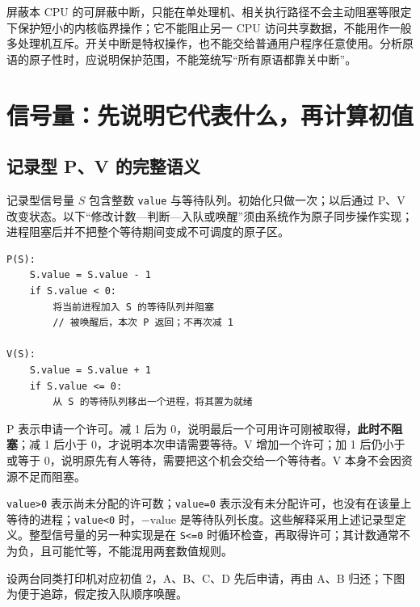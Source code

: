 屏蔽本 CPU 的可屏蔽中断，只能在单处理机、相关执行路径不会主动阻塞等限定下保护短小的内核临界操作；它不能阻止另一 CPU 访问共享数据，不能用作一般多处理机互斥。开关中断是特权操作，也不能交给普通用户程序任意使用。分析原语的原子性时，应说明保护范围，不能笼统写``所有原语都靠关中断''。

\section{信号量：先说明它代表什么，再计算初值}\label{sec-semaphore}

\subsection{记录型 P、V 的完整语义}\label{os-c03-h106}

记录型信号量 \(S\) 包含整数 \allowbreak{}\texttt{value} 与等待队列。初始化只做一次；以后通过 P、V 改变状态。以下``修改计数---判断---入队或唤醒''须由系统作为原子同步操作实现；进程阻塞后并不把整个等待期间变成不可调度的原子区。

\par\medskip\noindent
\begin{minipage}{\linewidth}
\begin{verbatim}
P(S):
    S.value = S.value - 1
    if S.value < 0:
        将当前进程加入 S 的等待队列并阻塞
        // 被唤醒后，本次 P 返回；不再次减 1

V(S):
    S.value = S.value + 1
    if S.value <= 0:
        从 S 的等待队列移出一个进程，将其置为就绪
\end{verbatim}
\end{minipage}\par\medskip

P 表示申请一个许可。减 1 后为 0，说明最后一个可用许可刚被取得，\textbf{此时不阻塞}；减 1 后小于 0，才说明本次申请需要等待。V 增加一个许可；加 1 后仍小于或等于 0，说明原先有人等待，需要把这个机会交给一个等待者。V 本身不会因资源不足而阻塞。

\allowbreak{}\texttt{value\textgreater{}0} 表示尚未分配的许可数；\allowbreak{}\texttt{value=0} 表示没有未分配许可，也没有在该量上等待的进程；\allowbreak{}\texttt{value\textless{}0} 时，\(-\mathrm{value}\) 是等待队列长度。这些解释采用上述记录型定义。整型信号量的另一种实现是在 \allowbreak{}\texttt{S\textless{}=0} 时循环检查，再取得许可；其计数通常不为负，且可能忙等，不能混用两套数值规则。

设两台同类打印机对应初值 2，A、B、C、D 先后申请，再由 A、B 归还；下图为便于追踪，假定按入队顺序唤醒。

